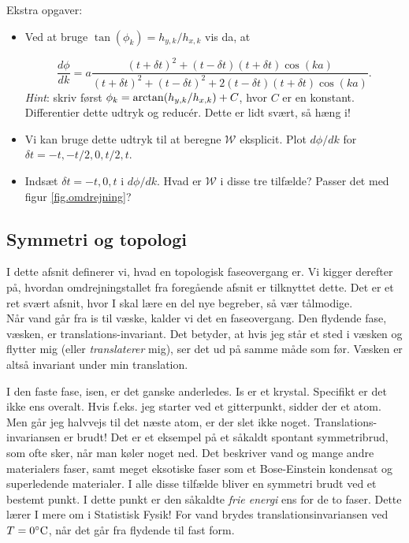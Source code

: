 \documentclass[11pt, a4paper]{article}
\begin{document}
Ekstra opgaver:
\begin{itemize}
	\item Ved at bruge $\tan(\phi_k) = h_{y, k} / h_{x, k}$ vis da, at

	\begin{equation}
	\frac{d\phi}{dk} = a \frac{(t + \delta t)^2 + (t - \delta t)(t + \delta t)\cos(ka)}{(t + \delta t)^2 + (t - \delta t)^2 + 2 (t - \delta t)(t + \delta t)\cos(ka)}. 
	\end{equation}
	\textit{Hint}: skriv først $\phi_k = {\rm arctan}(h_{y, k} / h_{x, k}) + C$, hvor $C$ er en konstant. Differentier dette udtryk og reducér. Dette er lidt svært, så hæng i! 

	\item Vi kan bruge dette udtryk til at beregne $\mathcal{W}$ eksplicit. Plot $d\phi / dk$ for $\delta t = -t, -t / 2, 0, t / 2, t$. 

	\item Indsæt $\delta t = - t, 0, t$ i $d \phi / dk$. Hvad er $\mathcal{W}$ i disse tre tilfælde? Passer det med figur \ref{fig.omdrejning}? 
\end{itemize}


\subsection{Symmetri og topologi}
I dette afsnit definerer vi, hvad en topologisk faseovergang er. Vi kigger derefter på, hvordan omdrejningstallet fra foregående afsnit er tilknyttet dette. Det er et ret svært afsnit, hvor I skal lære en del nye begreber, så vær tålmodige. \\

Når vand går fra is til væske, kalder vi det en faseovergang. Den flydende fase, væsken, er translations-invariant. Det betyder, at hvis jeg står et sted i væsken og flytter mig (eller \textit{translaterer} mig), ser det ud på samme måde som før. Væsken er altså invariant under min translation. 

I den faste fase, isen, er det ganske anderledes. Is er et krystal. Specifikt er det ikke ens overalt. Hvis f.eks. jeg starter ved et gitterpunkt, sidder der et atom. Men går jeg halvvejs til det næste atom, er der slet ikke noget. Translations-invariansen er brudt! Det er et eksempel på et såkaldt spontant symmetribrud, som ofte sker, når man køler noget ned. Det beskriver vand og mange andre materialers faser, samt meget eksotiske faser som et Bose-Einstein kondensat og superledende materialer. I alle disse tilfælde bliver en symmetri brudt ved et bestemt punkt. I dette punkt er den såkaldte \textit{frie energi} ens for de to faser. Dette lærer I mere om i Statistisk Fysik! For vand brydes translationsinvariansen ved $T = 0\degree {\rm C}$, når det går fra flydende til fast form. \\
\end{document}
